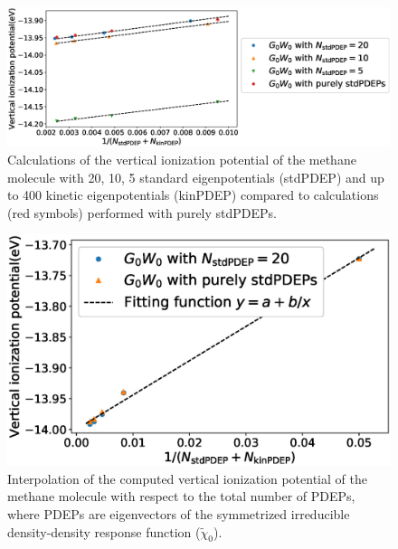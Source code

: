 \documentclass[aip]{revtex4-1}
\begin{document}
\begin{figure}
    \centering
    \includegraphics[width=0.8\linewidth]{fig/Fitting_from_different_stdPDEP.eps}
    \caption{Calculations of the vertical ionization potential of the methane molecule with 20, 10, 5 standard eigenpotentials (stdPDEP) and up to 400 kinetic eigenpotentials (kinPDEP) compared to calculations (red symbols) performed  with purely stdPDEPs.}
    \label{fig:different_number_of_PDEPs}
\end{figure}

\begin{figure}
    \centering
    \includegraphics[width=0.8\linewidth]{fig/Fitting_example_of_CH4_1_to_N.eps}
    \caption{Interpolation of the computed vertical ionization potential of the methane molecule with respect to the total number of PDEPs, where PDEPs are eigenvectors of the symmetrized irreducible density-density response function ($\tilde{\chi}_0$).}
    \label{fig:interpolation_from20}
\end{figure}
\end{document}
